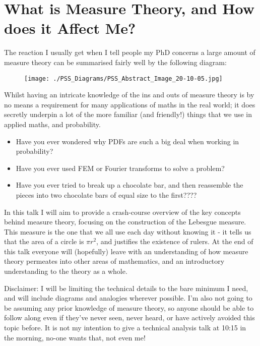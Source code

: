 \documentclass[11pt]{report}
\begin{document}
\chapter*{What is Measure Theory, and How does it Affect Me?}

The reaction I usually get when I tell people my PhD concerns a large amount of measure theory can be summarised fairly well by the following diagram:
\begin{figure}[h!]
	\centering
	\texttt{[image: ./PSS\_Diagrams/PSS\_Abstract\_Image\_20-10-05.jpg]}
\end{figure}

Whilst having an intricate knowledge of the ins and outs of measure theory is by no means a requirement for many applications of maths in the real world; it does secretly underpin a lot of the more familiar (and friendly!) things that we use in applied maths, and probability.
\begin{itemize}
	\item Have you ever wondered why PDFs are such a big deal when working in probability?
	\item Have you ever used FEM or Fourier transforms to solve a problem?
	\item Have you ever tried to break up a chocolate bar, and then reassemble the pieces into two chocolate bars of equal size to the first????
\end{itemize}
In this talk I will aim to provide a crash-course overview of the key concepts behind measure theory, focusing on the construction of the Lebesgue measure.
This measure is the one that we all use each day without knowing it - it tells us that the area of a circle is $\pi r^2$, and justifies the existence of rulers.
At the end of this talk everyone will (hopefully) leave with an understanding of how measure theory permeates into other areas of mathematics, and an introductory understanding to the theory as a whole. \newline

Disclaimer: I will be limiting the technical details to the bare minimum I need, and will include diagrams and analogies wherever possible.
I'm also not going to be assuming any prior knowledge of measure theory, so anyone should be able to follow along even if they've never seen, never heard, or have actively avoided this topic before.
It is not my intention to give a technical analysis talk at 10:15 in the morning, no-one wants that, not even me!
\end{document}
